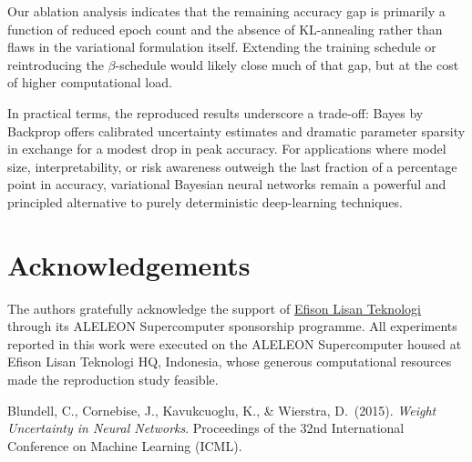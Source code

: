 \documentclass{article}
\begin{document}
Our ablation analysis indicates that the remaining accuracy gap is primarily a function of reduced epoch count and the absence of KL-annealing rather than flaws in the variational formulation itself.  Extending the training schedule or reintroducing the $\beta$-schedule would likely close much of that gap, but at the cost of higher computational load.

In practical terms, the reproduced results underscore a trade-off: Bayes by Backprop offers calibrated uncertainty estimates and dramatic parameter sparsity in exchange for a modest drop in peak accuracy.  For applications where model size, interpretability, or risk awareness outweigh the last fraction of a percentage point in accuracy, variational Bayesian neural networks remain a powerful and principled alternative to purely deterministic deep-learning techniques.
\section*{Acknowledgements}

The authors gratefully acknowledge the support of \href{https://efisonlt.com}{Efison Lisan Teknologi} through its ALELEON Supercomputer sponsorship programme.  All experiments reported in this work were executed on the ALELEON Supercomputer housed at Efison Lisan Teknologi HQ, Indonesia, whose generous computational resources made the reproduction study feasible.

\begin{thebibliography}{9}
Blundell, C., Cornebise, J., Kavukcuoglu, K., \& Wierstra, D.\ (2015).  
\textit{Weight Uncertainty in Neural Networks}.  
Proceedings of the 32nd International Conference on Machine Learning (ICML).
\end{thebibliography}
\end{document}
